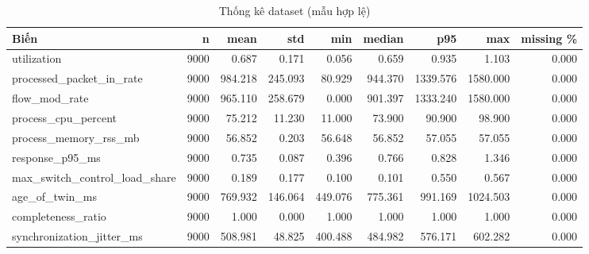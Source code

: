 \begin{table}[H]\centering\small
\caption{Thống kê dataset (mẫu hợp lệ)}\label{tab:w10-dataset}
\begin{tabular}{lrrrrrrrr}\toprule
Biến & n & mean & std & min & median & p95 & max & missing \% \\\midrule
utilization & 9000 & 0.687 & 0.171 & 0.056 & 0.659 & 0.935 & 1.103 & 0.000 \\
processed\_packet\_in\_rate & 9000 & 984.218 & 245.093 & 80.929 & 944.370 & 1339.576 & 1580.000 & 0.000 \\
flow\_mod\_rate & 9000 & 965.110 & 258.679 & 0.000 & 901.397 & 1333.240 & 1580.000 & 0.000 \\
process\_cpu\_percent & 9000 & 75.212 & 11.230 & 11.000 & 73.900 & 90.900 & 98.900 & 0.000 \\
process\_memory\_rss\_mb & 9000 & 56.852 & 0.203 & 56.648 & 56.852 & 57.055 & 57.055 & 0.000 \\
response\_p95\_ms & 9000 & 0.735 & 0.087 & 0.396 & 0.766 & 0.828 & 1.346 & 0.000 \\
max\_switch\_control\_load\_share & 9000 & 0.189 & 0.177 & 0.100 & 0.101 & 0.550 & 0.567 & 0.000 \\
age\_of\_twin\_ms & 9000 & 769.932 & 146.064 & 449.076 & 775.361 & 991.169 & 1024.503 & 0.000 \\
completeness\_ratio & 9000 & 1.000 & 0.000 & 1.000 & 1.000 & 1.000 & 1.000 & 0.000 \\
synchronization\_jitter\_ms & 9000 & 508.981 & 48.825 & 400.488 & 484.982 & 576.171 & 602.282 & 0.000 \\
\bottomrule\end{tabular}
\end{table}
